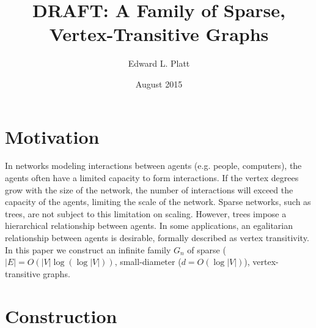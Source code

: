 \documentclass{article}
\title{DRAFT: A Family of Sparse, Vertex-Transitive Graphs}
\author{Edward L. Platt}
\date{August 2015}
\begin{document}
\maketitle

\section{Motivation}
In networks modeling interactions between agents (e.g. people, computers),
the agents often have a limited capacity to form interactions.
If the vertex degrees grow with the size of the network,
the number of interactions will exceed the capacity of the agents,
limiting the scale of the network.
Sparse networks, such as trees, are not subject to this limitation on scaling.
However, trees impose a hierarchical relationship between agents.
In some applications, an egalitarian relationship between agents is desirable,
formally described as vertex transitivity.
In this paper we construct an infinite family $G_n$
of sparse ($|E| = O(|V|\log(\log |V|))$,
small-diameter ($d = O(\log |V|)$), vertex-transitive graphs.

\section{Construction}
\end{document}
